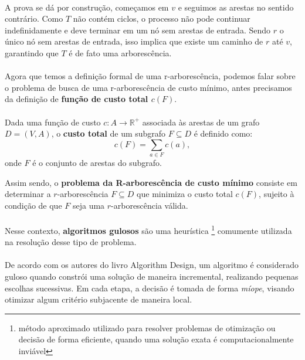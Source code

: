 \documentclass[12pt,a4paper]{article}
\begin{document}
\paragraph{}
A prova se dá por construção, começamos em \(v\) e seguimos as arestas no sentido contrário. Como \(T\) não contém ciclos, o processo não pode continuar indefinidamente e deve terminar em um nó sem arestas de entrada. Sendo \(r\) o único nó sem arestas de entrada, isso implica que existe um caminho de \(r\) até \(v\), garantindo que \(T\) é de fato uma arborescência.

\paragraph{}
Agora que temos a definição formal de uma r-arborescência, podemos falar sobre o problema de busca de uma r-arborescência de custo mínimo, antes precisamos da definição de \textbf{função de custo total \(c(F)\)}.

\paragraph{}
Dada uma função de custo \(c: A \to \mathbb{R}^+\) associada às arestas de um grafo \(D = (V, A)\), o \textbf{custo total} de um subgrafo \(F \subseteq D\) é definido como:
\[
c(F) = \sum_{a \in F} c(a),
\]
onde \(F\) é o conjunto de arestas do subgrafo.

Assim sendo, o \textbf{problema da R-arborescência de custo mínimo} consiste em determinar a \(r\)-arborescência \(F \subseteq D\) que minimiza o custo total \(c(F)\), sujeito à condição de que \(F\) seja uma \(r\)-arborescência válida.

\paragraph{}
Nesse contexto, \textbf{algoritmos gulosos} são uma heurística \footnote{método aproximado utilizado para resolver problemas de otimização ou decisão de forma eficiente, quando uma solução exata é computacionalmente inviável} comumente utilizada na resolução desse tipo de problema.

\paragraph{}
De acordo com os autores do livro Algorithm Design, um algoritmo é considerado guloso quando constrói uma solução de maneira incremental, realizando pequenas escolhas sucessivas. Em cada etapa, a decisão é tomada de forma \textit{míope}, visando otimizar algum critério subjacente de maneira local.
\end{document}
